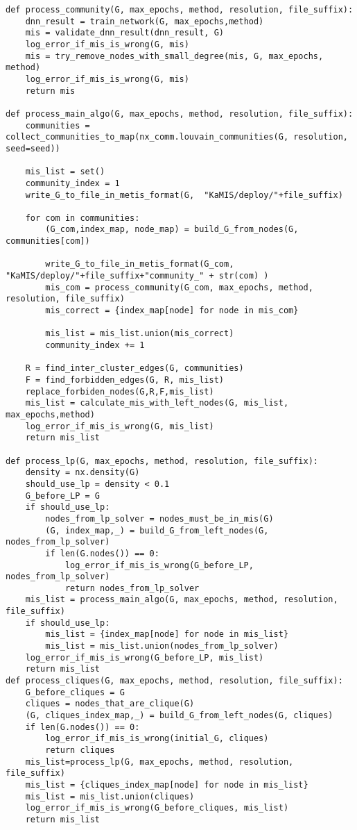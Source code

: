 \begin{lstlisting}
def process_community(G, max_epochs, method, resolution, file_suffix):
    dnn_result = train_network(G, max_epochs,method)
    mis = validate_dnn_result(dnn_result, G)
    log_error_if_mis_is_wrong(G, mis)
    mis = try_remove_nodes_with_small_degree(mis, G, max_epochs, method)
    log_error_if_mis_is_wrong(G, mis)
    return mis

def process_main_algo(G, max_epochs, method, resolution, file_suffix):
    communities = collect_communities_to_map(nx_comm.louvain_communities(G, resolution, seed=seed))
    
    mis_list = set()
    community_index = 1
    write_G_to_file_in_metis_format(G,  "KaMIS/deploy/"+file_suffix)
    
    for com in communities:
        (G_com,index_map, node_map) = build_G_from_nodes(G, communities[com])
        
        write_G_to_file_in_metis_format(G_com,  "KaMIS/deploy/"+file_suffix+"community_" + str(com) )
        mis_com = process_community(G_com, max_epochs, method, resolution, file_suffix)
        mis_correct = {index_map[node] for node in mis_com}
        
        mis_list = mis_list.union(mis_correct)        
        community_index += 1
        
    R = find_inter_cluster_edges(G, communities)
    F = find_forbidden_edges(G, R, mis_list)
    replace_forbiden_nodes(G,R,F,mis_list)
    mis_list = calculate_mis_with_left_nodes(G, mis_list, max_epochs,method)
    log_error_if_mis_is_wrong(G, mis_list)
    return mis_list

def process_lp(G, max_epochs, method, resolution, file_suffix):
    density = nx.density(G)
    should_use_lp = density < 0.1
    G_before_LP = G
    if should_use_lp:
        nodes_from_lp_solver = nodes_must_be_in_mis(G)
        (G, index_map,_) = build_G_from_left_nodes(G, nodes_from_lp_solver)
        if len(G.nodes()) == 0:
            log_error_if_mis_is_wrong(G_before_LP, nodes_from_lp_solver)
            return nodes_from_lp_solver
    mis_list = process_main_algo(G, max_epochs, method, resolution, file_suffix)
    if should_use_lp:
        mis_list = {index_map[node] for node in mis_list}
        mis_list = mis_list.union(nodes_from_lp_solver)
    log_error_if_mis_is_wrong(G_before_LP, mis_list)
    return mis_list
def process_cliques(G, max_epochs, method, resolution, file_suffix):
    G_before_cliques = G
    cliques = nodes_that_are_clique(G)
    (G, cliques_index_map,_) = build_G_from_left_nodes(G, cliques)
    if len(G.nodes()) == 0:
        log_error_if_mis_is_wrong(initial_G, cliques)
        return cliques
    mis_list=process_lp(G, max_epochs, method, resolution, file_suffix)
    mis_list = {cliques_index_map[node] for node in mis_list}
    mis_list = mis_list.union(cliques)
    log_error_if_mis_is_wrong(G_before_cliques, mis_list)
    return mis_list


\end{lstlisting}
